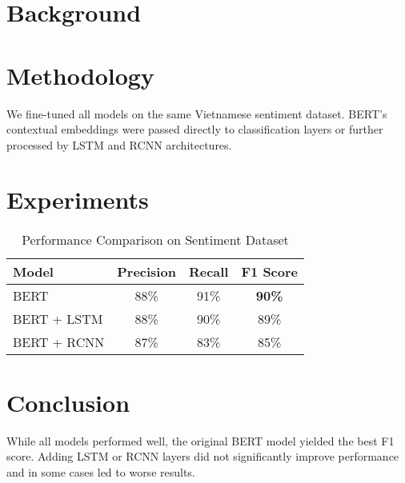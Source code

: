 \documentclass[11pt]{article}
\begin{document}
\section{Background}
\label{sec:background}

\section{Methodology}
\label{sec:methodology}
We fine-tuned all models on the same Vietnamese sentiment dataset. BERT's contextual embeddings were passed directly to classification layers or further processed by LSTM and RCNN architectures.

\section{Experiments}
\label{sec:experiments}

\begin{table}[h]
\centering
\caption{Performance Comparison on Sentiment Dataset}
\begin{tabular}{lccc}
\toprule
Model & Precision & Recall & F1 Score \\
\midrule
BERT & 88\% & 91\% & \textbf{90\%} \\
BERT + LSTM & 88\% & 90\% & 89\% \\
BERT + RCNN & 87\% & 83\% & 85\% \\
\bottomrule
\end{tabular}
\label{tab:results}
\end{table}


\section{Conclusion}
\label{sec:conclusion}
While all models performed well, the original BERT model yielded the best F1 score. Adding LSTM or RCNN layers did not significantly improve performance and in some cases led to worse results.




\end{document}
